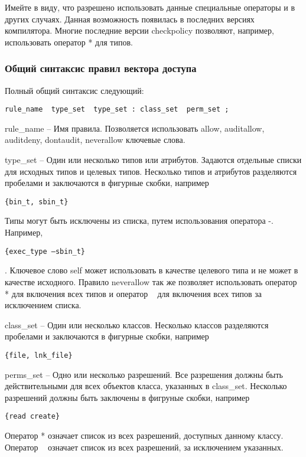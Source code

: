 \documentclass{./../class/UIR}
\begin{document}
Имейте в виду, что разрешено использовать данные специальные операторы и в
других случаях. Данная возможность появилась в последних версиях компилятора.
Многие последние версии checkpolicy позволяют, например, использовать оператор *
для типов.

\subsubsection{Общий синтаксис правил вектора доступа}

Полный общий синтаксис следующий:

\begin{verbatim}
rule_name  type_set  type_set : class_set  perm_set ;
\end{verbatim}
\begin{description}
\item rule\_name – Имя правила. Позволяется использовать allow, auditallow,
auditdeny, dontaudit, neverallow ключевые слова.

\item type\_set – Один или несколько типов или атрибутов. Задаются
отдельные списки для исходных типов и целевых типов. Несколько типов и атрибутов
разделяются пробелами и заключаются в фигурные скобки, например 
\begin{verbatim}{bin_t, sbin_t}\end{verbatim}
Типы могут быть исключены из списка, путем использования оператора -. Например,

\begin{verbatim}{exec_type –sbin_t}\end{verbatim}. Ключевое слово self может
использовать в качестве целевого типа и не может в качестве исходного. Правило neverallow так же позволяет
использовать оператор * для включения всех типов и оператор ~ для включения всех
типов за исключением списка.

\item class\_set – Один или несколько классов. Несколько классов разделяются
пробелами и заключаются в фигурные скобки, например 
\begin{verbatim}{file, lnk_file}\end{verbatim}

\item perms\_set – Одно или несколько разрешений. Все разрешения должны быть
действительными для всех объектов класса, указанных в class\_set. Несколько
разрешений должны быть заключены в фигруные скобки, например 
\begin{verbatim}{read create}\end{verbatim}
Оператор * означает список из всех разрешений, доступных данному классу.
Оператор ~ означает список из всех разрешений, за исключением указанных.

\end{description}
\end{document}
